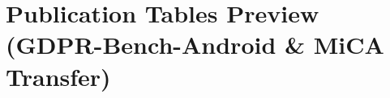 \documentclass[11pt]{article}
\begin{document}
\section*{Publication Tables Preview (GDPR-Bench-Android \& MiCA Transfer)}

\vspace{1em}

\vspace{1em}

\vspace{1em}

\vspace{1em}

\vspace{1em}

\end{document}
